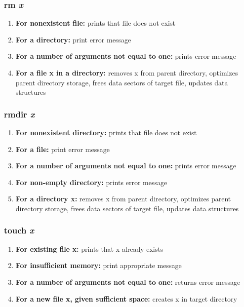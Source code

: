 \documentclass[a4paper]{article}
\begin{document}
\subsubsection{rm \textit{x}}
\begin{enumerate}
\item {\textbf{For nonexistent file: } prints that file does not exist}
\item {\textbf{For a directory: } print error message}
\item {\textbf{For a number of arguments not equal to one: } prints error message}
\item {\textbf{For a file x in a directory: } removes x from parent directory, optimizes parent directory storage, frees data sectors of target file, updates data structures}
\end{enumerate}

\subsubsection{rmdir \textit{x}}
\begin{enumerate}
\item {\textbf{For nonexistent directory: } prints that file does not exist}
\item {\textbf{For a file: } print error message}
\item {\textbf{For a number of arguments not equal to one: } prints error message}
\item {\textbf{For non-empty directory: } prints error message}
\item {\textbf{For a directory x: } removes x from parent directory, optimizes parent directory storage, frees data sectors of target file, updates data structures}
\end{enumerate}

\subsubsection{touch \textit{x}}
\begin{enumerate}
\item {\textbf{For existing file x: } prints that x already exists}
\item {\textbf{For insufficient memory: } print appropriate message}
\item {\textbf{For a number of arguments not equal to one: } returns error message}
\item {\textbf{For a new file x, given sufficient space: } creates x in target directory}
\end{enumerate}
\end{document}

